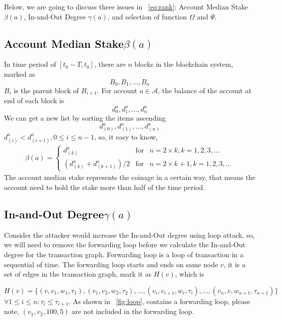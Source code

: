 Below, we are going to discuss three issues in ~\ref{eq:rank}: Account Median Stake $\beta(a)$, In-and-Out Degree $\gamma(a)$, and selection of function $\Omega$ and $\Psi$.

\subsection{Account Median Stake$\beta(a)$}
In time period of $[t_0-T, t_0]$, there are $n$ blocks in the blockchain system, marked as
\[
B_0, B_1, \dots, B_n
\]
\noindent $B_{i}$ is the parent block of $B_{i+1}$. For account $a \in \mathcal{A}$, the balance of the account at end of each block is
\[
d^a_0, d^a_1, \dots, d^a_n
\]
We can get a new list by sorting the items ascending 
\[
d^a_{(0)}, d^a_{(1)}, \dots, d^a_{(n)}
\]
$d^a_{(i)} < d^a_{(i+1)}, 0\le i \le {n-1}$, so, it easy to know,
\begin{align}
\beta(a) = \left\{ \begin{array}{rcl}
{d^a_{(k)}} & \mbox{for} & n=2\times{}k, k=1, 2, 3, \ldots \\
{(d^a_{(k)} + d^a_{(k+1)})/2} & \mbox{for} & n=2\times{}k + 1, k=1, 2, 3, \ldots
\end{array}\right.
\end{align}
The account median stake represents the coinage in a certain way, that means the account need to hold the stake more than half of the time period.

\subsection{In-and-Out Degree$\gamma(a)$}
Consider the attacker would increase the In-and-Out degree using loop attack, so, we will need to remove the forwarding loop before we calculate the In-and-Out degree for the transaction graph. Forwarding loop is a loop of transaction in a sequential of time.
The forwarding loop starts and ends on same node $v$, it is a set of edges in the transaction graph, mark it as $H(v)$, which is

\[
H(v) = \{(v, v_1, w_1, \tau_1), (v_1, v_2, w_2, \tau_2), \dots, (v_i, v_{i+1}, w_{i}, \tau_i), \dots, (v_n, v, w_{n+1}, \tau_{n+1})\}
\]
\noindent $\forall 1\le i \le n : \tau_i \le \tau_{i+1} $.
\noindent As shown in ~\ref{fig:loop}, contains a forwarding loop, please note, $(v_1, v_2, 100, 5)$ are not included in the forwarding loop.




